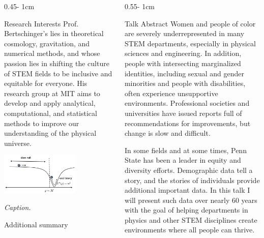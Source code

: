 \documentclass{../psuposter}
\begin{document}
\begin{frame}
\begin{columns}[t, totalwidth=\textwidth]
\begin{column}{0.45\textwidth - 1cm}
    \begin{block}{Research Interests}
        Prof. Bertschinger's lies in theoretical cosmology, gravitation, and numerical methods, and whose passion lies in shifting the culture of STEM fields to be inclusive and equitable for everyone. His research group at MIT aims to develop and apply analytical, computational, and statistical methods to improve our understanding of the physical universe.  
        \begin{center}
	    	\includegraphics[width=0.65\textwidth]{images/research}    		
    	\end{center}
    	\textit{Caption.} 
    	
    	Additional summary
    \end{block}
\end{column}
\begin{column}{0.55\textwidth - 1cm}


    \begin{block}{Talk Abstract}
    	Women and people of color are severely underrepresented in many STEM departments, especially in physical sciences and engineering. In addition, people with intersecting marginalized identities, including sexual and gender minorities and people with disabilities, often experience unsupportive environments. Professional societies and universities have issued reports full of recommendations for improvements, but change is slow and difficult.

        In some fields and at some times, Penn State has been a leader in equity and diversity efforts. Demographic data tell a story, and the stories of individuals provide additional important data. In this talk I will present such data over nearly 60 years with the goal of helping departments in physics and other STEM disciplines create environments where all people can thrive.
    \end{block}



\end{column}
\end{columns}
\end{frame}
\end{document}
